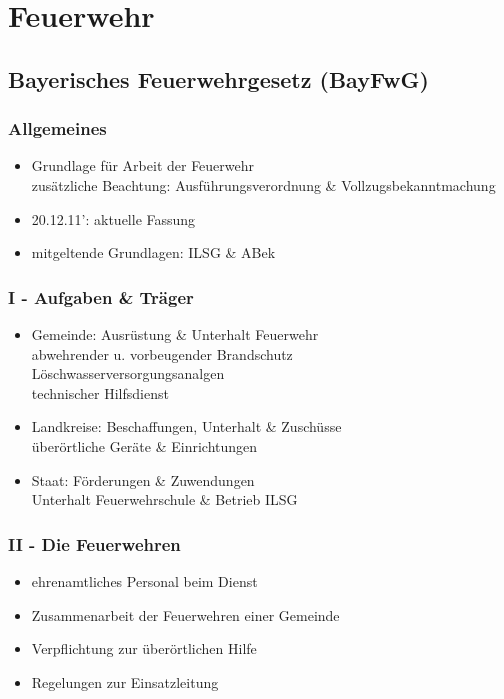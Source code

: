 \section{Feuerwehr}
\subsection{Bayerisches Feuerwehrgesetz (BayFwG)}
\begin{normbox}{\subsubsection{Allgemeines}}
    \begin{itemize}
        \item Grundlage für Arbeit der Feuerwehr\\
        \ra zusätzliche Beachtung: Ausführungsverordnung \& Vollzugsbekanntmachung
        \item 20.12.11': aktuelle Fassung
        \item mitgeltende Grundlagen: ILSG \& ABek
    \end{itemize}
\end{normbox}
\begin{normbox}{\subsubsection{I - Aufgaben \& Träger}}
    \begin{itemize}
        \item Gemeinde: Ausrüstung \& Unterhalt Feuerwehr\\
        \ra abwehrender u. vorbeugender Brandschutz\\
        \ra Löschwasserversorgungsanalgen\\
        \ra technischer Hilfsdienst
        \item Landkreise: Beschaffungen, Unterhalt \& Zuschüsse\\
        \ra überörtliche Geräte \& Einrichtungen
        \item Staat: Förderungen \& Zuwendungen\\
        \ra Unterhalt Feuerwehrschule \& Betrieb ILSG 
    \end{itemize}
\end{normbox}
\begin{normbox}{\subsubsection{II - Die Feuerwehren}}
    \begin{itemize}
        \item ehrenamtliches Personal beim Dienst 
        \item Zusammenarbeit der Feuerwehren einer Gemeinde
        \item Verpflichtung zur überörtlichen Hilfe
        \item Regelungen zur Einsatzleitung
    \end{itemize}
\end{normbox}
